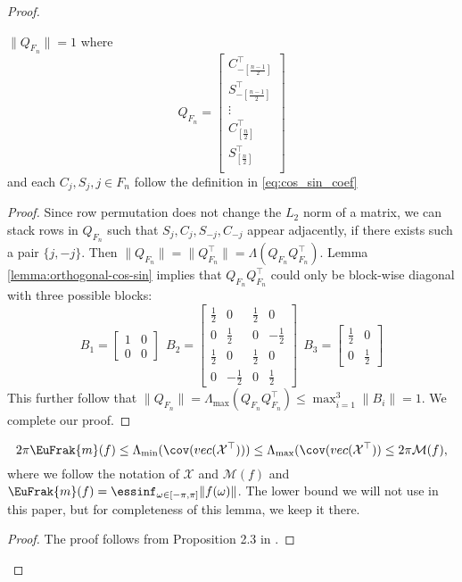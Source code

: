 \begin{proof}
\begin{lem}
\label{lemma:maximum_L2_Q}
$\|Q_{F_n}\|= 1$
where 
\begin{equation}
Q_{F_n} = \begin{bmatrix}
C_{-[\frac{n-1}{2}]}^\top\\ 
S_{-[\frac{n-1}{2}]}^\top \\
\vdots \\
C_{[\frac{n}{2}]}^\top\\ 
S_{[\frac{n}{2}]}^\top \\
\end{bmatrix}
\end{equation}
and each $C_j, S_j, j\in F_n$ follow the definition in \eqref{eq:cos_sin_coef} 
\begin{proof}
Since row permutation does not change the $L_2$ norm of a matrix, we can stack rows in $Q_{F_n}$ such that $S_j,C_j,S_{-j}, C_{-j}$ appear adjacently, if there exists such a pair $\{j, -j\}$. Then $\|Q_{F_n}\|=\|Q^\top_{F_n}\| = \Lambda(Q_{F_n}Q_{F_n}^\top)$. Lemma \ref{lemma:orthogonal-cos-sin} implies that $Q_{F_n}Q_{F_n}^\top$ could only be block-wise diagonal with three possible blocks:
\begin{equation*}
B_1=\begin{bmatrix}
1&0\\
0&0
\end{bmatrix} ~~B_2 = \begin{bmatrix}
\frac{1}{2} & 0 & \frac{1}{2} & 0\\
0 & \frac{1}{2} & 0 & -\frac{1}{2}\\
\frac{1}{2} & 0 & \frac{1}{2} & 0 \\
0 & -\frac{1}{2} & 0 & \frac{1}{2}
\end{bmatrix}~~
B_3 = \begin{bmatrix}
\frac{1}{2} & 0\\
0 & \frac{1}{2}
\end{bmatrix}
\end{equation*}
This further follow that $\|Q_{F_n}\|=\Lambda_{\max}(Q_{F_n}Q_{F_n}^\top )\le \max_{i=1}^3 \|B_i\|=1$. We complete our proof. 
\end{proof}
\end{lem}


\begin{lem}
\label{lemma:max-L2-norm}
\[
2\pi \EuFrak{m}(f) \le \Lambda_{\text{min}}(\cov(vec(\mathcal{\mathcal{X}}^\top))) \le \Lambda_{\text{max}}(\cov(vec(\mathcal{\mathcal{X}}^\top)) \le 2\pi \mathcal{M}(f),
\]
where we follow the notation of $\mathcal{\mathcal{X}}$ and $\mathcal{M}(f)$ and $\EuFrak{m}(f)  = \essinf_{\omega \in [-\pi, \pi]}\|f(\omega)\|$. The lower bound we will not use in this paper, but for completeness of this lemma, we keep it there. 
\begin{proof}
The proof follows from Proposition 2.3 in \citet{Basu2015}. 
\end{proof}
\end{lem}


\end{proof}
